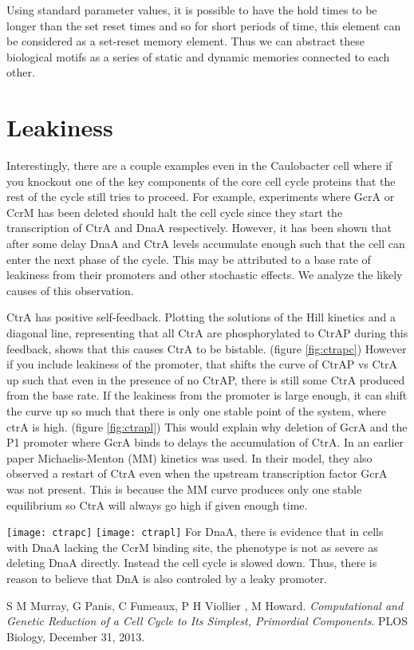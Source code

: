 \documentclass{article}
\begin{document}
\newline Using standard parameter values, it is possible to have the hold times to be longer than the set reset times and so for short periods of time, this element can be considered as a set-reset memory element.  Thus we can abstract these biological motifs as a series of static and dynamic memories connected to each other.


\section{Leakiness}
Interestingly, there are a couple examples even in the Caulobacter cell where if you knockout one of the key components of the core cell cycle proteins that the rest of the cycle still tries to proceed.  For example, experiments where GcrA or CcrM has been deleted should halt the cell cycle since they start the transcription of CtrA and DnaA respectively.  However, it has been shown that after some delay DnaA and CtrA levels accumulate enough such that the cell can enter the next phase of the cycle.  This may be attributed to a base rate of leakiness from their promoters and other stochastic effects.  We analyze the likely causes of this observation.

CtrA has positive self-feedback.  Plotting the solutions of the Hill kinetics and a diagonal line, representing that all CtrA are phosphorylated to CtrAP during this feedback, shows that this causes CtrA to be bistable. (figure \ref{fig:ctrapc})  However if you include leakiness of the promoter, that shifts the curve of CtrAP vs CtrA up such that even in the presence of no CtrAP, there is still some CtrA produced from the base rate.  If the leakiness from the promoter is large enough, it can shift the curve up so much that there is only one stable point of the system, where ctrA is high. (figure \ref{fig:ctrapl}) This would explain why deletion of GcrA and the P1 promoter where GcrA binds to delays the accumulation of CtrA.  In an earlier paper \cite{compgenre} Michaelis-Menton (MM) kinetics was used.  In their model, they also observed a restart of CtrA even when the upstream transcription factor GcrA was not present.  This is because the MM curve produces only one stable equilibrium so CtrA will always go high if given enough time.

\texttt{[image: ctrapc]}
\texttt{[image: ctrapl]}
\newline \newline
For DnaA, there is evidence that in cells with DnaA lacking the CcrM binding site, the phenotype is not as severe as deleting DnaA directly.  Instead the cell cycle is slowed down.  Thus, there is reason to believe that DnA is also controled by a leaky promoter.  

\begin{thebibliography}{9}
S M Murray, G Panis, C Fumeaux, P H Viollier , M Howard. 
\textit{Computational and Genetic Reduction of a Cell Cycle to Its Simplest, Primordial Components}. 
PLOS Biology, December 31, 2013.
 
\end{thebibliography}
	
\end{document}

